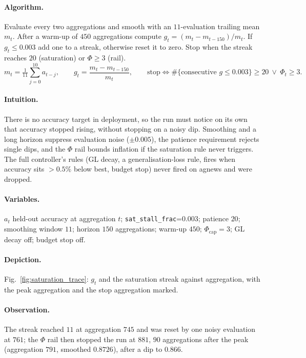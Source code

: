 \paragraph{Algorithm.}
Evaluate every two aggregations and smooth with an $11$-evaluation trailing mean $m_t$. After a warm-up of $450$ aggregations compute $g_t=(m_t-m_{t-150})/m_t$.
If $g_t\le0.003$ add one to a streak, otherwise reset it to zero. Stop when the streak reaches $20$ (saturation) or $\Phi\ge3$ (rail).
\begin{equation}
m_t=\tfrac1{11}\sum_{j=0}^{10}a_{t-j},\qquad g_t=\frac{m_t-m_{t-150}}{m_t},\qquad
\text{stop}\iff\#\{\text{consecutive }g\le0.003\}\ge20\ \lor\ \Phi_t\ge3 .
\end{equation}
\paragraph{Intuition.}
There is no accuracy target in deployment, so the run must notice on its own that accuracy stopped rising, without stopping on a noisy dip.
Smoothing and a long horizon suppress evaluation noise ($\pm0.005$), the patience requirement rejects single dips, and the $\Phi$ rail bounds inflation if the saturation rule never triggers.
The full controller's rules (GL decay, a generalisation-loss rule, fires when accuracy sits $>0.5\%$ below best, budget stop) never fired on agnews and were dropped.
\paragraph{Variables.}
$a_t$ held-out accuracy at aggregation $t$; \texttt{sat\_stall\_frac}=0.003; patience $20$; smoothing window $11$; horizon $150$ aggregations; warm-up $450$; $\Phi_{\mathrm{cap}}=3$; GL decay off; budget stop off.
\paragraph{Depiction.} Fig.~\ref{fig:saturation_trace}: $g_t$ and the saturation streak against aggregation, with the peak aggregation and the stop aggregation marked.
\paragraph{Observation.}
The streak reached $11$ at aggregation $745$ and was reset by one noisy evaluation at $761$; the $\Phi$ rail then stopped the run at $881$, $90$ aggregations after the peak (aggregation $791$, smoothed $0.8726$), after a dip to $0.866$.

